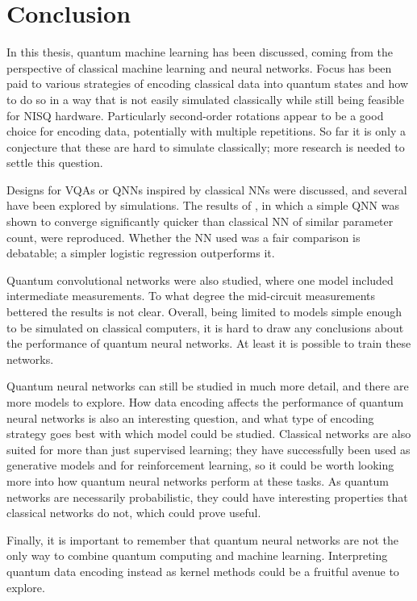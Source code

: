 \chapter{Conclusion}
\label{chap:conclusion}
In this thesis, quantum machine learning has been discussed, coming from the perspective of classical machine learning and neural networks.
Focus has been paid to various strategies of encoding classical data into quantum states and how to do so in a way that is not easily simulated classically while still being feasible for NISQ hardware.
Particularly second-order rotations appear to be a good choice for encoding data, potentially with multiple repetitions.
So far it is only a conjecture that these are hard to simulate classically; more research is needed to settle this question.

Designs for VQAs or QNNs inspired by classical NNs were discussed, and several have been explored by simulations.
The results of \cite{abbas2021}, in which a simple QNN was shown to converge significantly quicker than classical NN of similar parameter count, were reproduced.
Whether the NN used was a fair comparison is debatable; a simpler logistic regression outperforms it.

Quantum convolutional networks were also studied, where one model included intermediate measurements.
To what degree the mid-circuit measurements bettered the results is not clear.
Overall, being limited to models simple enough to be simulated on classical computers, it is hard to draw any conclusions about the performance of quantum neural networks.
At least it is possible to train these networks.

Quantum neural networks can still be studied in much more detail, and there are more models to explore.
How data encoding affects the performance of quantum neural networks is also an interesting question, and what type of encoding strategy goes best with which model could be studied.
Classical networks are also suited for more than just supervised learning; they have successfully been used as generative models and for reinforcement learning, so it could be worth looking more into how quantum neural networks perform at these tasks.
As quantum networks are necessarily probabilistic, they could have interesting properties that classical networks do not, which could prove useful.

Finally, it is important to remember that quantum neural networks are not the only way to combine quantum computing and machine learning.
Interpreting quantum data encoding instead as kernel methods could be a fruitful avenue to explore.